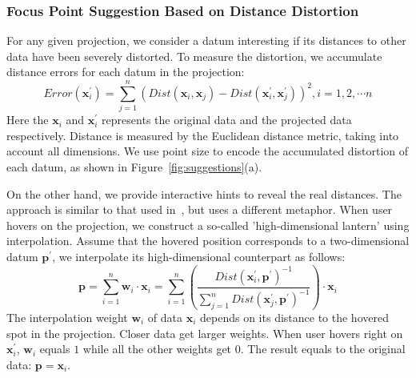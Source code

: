 \subsubsection{Focus Point Suggestion Based on Distance Distortion}
For any given projection, we consider a datum interesting if its distances to other data have been severely distorted. To measure the distortion, we accumulate distance errors for each datum in the projection:
\begin{equation}
Error(\mathbf{x}_{i}^{\prime}) = \sum\limits_{j=1}^{n}(Dist(\mathbf{x}_{i}, \mathbf{x}_{j}) - Dist(\mathbf{x}_{i}^{\prime}, \mathbf{x}_{j}^{\prime}))^{2}, i = 1,2,\cdots n
\end{equation}
Here the $\mathbf{x}_{i}$ and $\mathbf{x}_{i}^{\prime}$ represents the original data and the projected data respectively. Distance is measured by the Euclidean distance metric, taking into account all dimensions. We use point size to encode the accumulated distortion of each datum, as shown in Figure~\ref{fig:suggestions}(a).

On the other hand, we provide interactive hints to reveal the real distances. The approach is similar to that used in~\cite{DBLP:journals/tvcg/StahnkeDMT16}, but uses a different metaphor. When user hovers on the projection, we construct a so-called 'high-dimensional lantern' using interpolation. Assume that the hovered position corresponds to a two-dimensional datum $\mathbf{p}^{\prime}$, we interpolate its high-dimensional counterpart as follows:
\begin{equation}
\mathbf{p} = \sum\limits_{i=1}^{n}\mathbf{w}_{i}\cdot\mathbf{x}_{i} =  \sum\limits_{i=1}^{n} \left (\frac{Dist(\mathbf{x}_{i}^{\prime}, \mathbf{p}^{\prime})^{-1}}{\sum\limits_{j=1}^{n}Dist(\mathbf{x}_{j}^{\prime}, \mathbf{p}^{\prime})^{-1}}\right )\cdot\mathbf{x}_{i}
\end{equation}
The interpolation weight $\mathbf{w}_{i}$ of data $\mathbf{x}_{i}$ depends on its distance to the hovered spot in the projection. Closer data get larger weights. When user hovers right on $\mathbf{x}_{i}^{\prime}$, $\mathbf{w}_{i}$ equals $1$ while all the other weights get $0$. The result equals to the original data: $\mathbf{p} = \mathbf{x}_{i}$.

